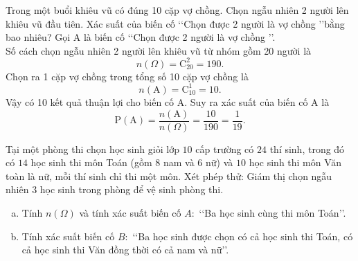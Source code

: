 \begin{bt}%
Trong một buổi khiêu vũ có đúng 10 cặp vợ chồng. Chọn ngẫu nhiên 2 người lên khiêu vũ đầu tiên. Xác suất của biến cố \lq\lq Chọn được 2 người là vợ chồng \rq\rq bằng bao nhiêu?
\loigiai
{
Gọi A là biến cố \lq\lq Chọn được 2 người là vợ chồng \rq\rq.\\
Số cách chọn ngẫu nhiên 2 người lên khiêu vũ từ nhóm gồm 20 người là
\[n\left(\Omega\right) = \mathrm{C}_{20}^2 = 190.\]
Chọn ra 1 cặp vợ chồng trong tổng số 10 cặp vợ chồng là
\[n\left(\mathrm{A}\right) = \mathrm{C}_{10}^1 = 10.\]
Vậy có 10 kết quả thuận lợi cho biến cố A. Suy ra xác suất của biến cố A là
\[\mathrm{P}(\mathrm{A}) = \frac{n\left(\mathrm{A}\right)}{n\left(\Omega\right)} = \frac{10}{190} = \frac{1}{19}.\]
}
\end{bt}

\begin{bt}%
	Tại một phòng thi chọn học sinh giỏi lớp $10$ cấp trường có $24$ thí sinh, trong đó có $14$ học sinh thi môn Toán (gồm $8$ nam và $6$ nữ) và $10$ học sinh thi môn Văn toàn là nữ, mỗi thí sinh chỉ thi một môn. Xét phép thử: Giám thị chọn ngẫu nhiên $3$ học sinh trong phòng để vệ sinh phòng thi.
	\begin{enumerate}[a)]
		\item Tính $n(\Omega)$ và tính xác suất biến cố $A\colon$ \lq\lq Ba học sinh cùng thi môn Toán\rq\rq.
		\item Tính xác suất biến cố $B\colon$ \lq\lq Ba học sinh được chọn có cả học sinh thi Toán, có cả học sinh thi Văn đồng thời có cả nam và nữ\rq\rq.
	\end{enumerate}
\end{bt}

